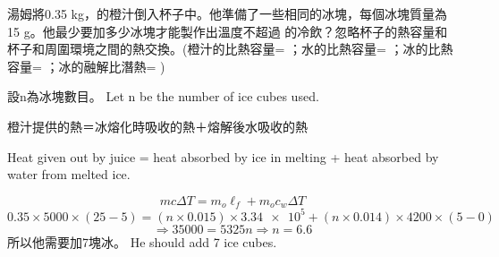{
    湯姆將0.35 kg，的橙汁倒入杯子中。他準備了一些相同的冰塊，每個冰塊質量為15 g。他最少要加多少冰塊才能製作出溫度不超過 的冷飲？忽略杯子的熱容量和杯子和周圍環境之間的熱交換。(橙汁的比熱容量= ；水的比熱容量= ；冰的比熱容量= ；冰的融解比潛熱= )
}{
    \sol
    設n為冰塊數目。 Let n be the number of ice cubes used.
    \par 橙汁提供的熱＝冰熔化時吸收的熱＋熔解後水吸收的熱
    \par Heat given out by juice = heat absorbed by ice in melting + heat absorbed by water from melted ice.

    \[mc\Delta T=m_o\ell_f+m_oc_w\Delta T\]
    \[0.35\times 5000\times (25-5)=(n\times 0.015)\times \num{3.34e5}+(n\times 0.014)\times 4200 \times (5-0)\]
    \[\Rightarrow 35000=5325n\Rightarrow n=6.6\]
    所以他需要加7塊冰。 He should add 7 ice cubes.
}